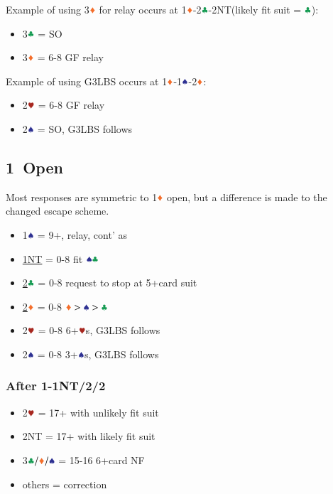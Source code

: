 \documentclass{article}
\begin{document}
\begin{multicols}{2}
\begin{CJK*}{UTF8}{gt}
\noindent Example of using 3$\ddd$ for relay occurs at 1$\ddd$-2$\ccc$-2NT(likely fit suit = $\ccc$):
\begin{itemize}
    \item 3$\ccc$ = SO
    \item 3$\ddd$ = 6-8 GF relay
\end{itemize}

\noindent Example of using G3LBS occurs at 1$\ddd$-1$\sss$-2$\ddd$:
\begin{itemize}
    \item 2$\hhh$ = 6-8 GF relay
    \item 2$\sss$ = SO, G3LBS follows
\end{itemize}

\subsection{1\HHH\ Open}\label{sec:1h}
Most responses are symmetric to 1$\ddd$ open, but a difference is made to the changed escape scheme.
\begin{itemize}
    \item 1$\sss$ = 9+, relay, cont' as 
    \item \hyperref[sec:1h-escape]{1NT} = 0-8 fit $\sss\ccc$
    \item \hyperref[sec:1h-escape]{2$\ccc$} = 0-8 request to stop at 5+card suit
    \item \hyperref[sec:1h-escape]{2$\ddd$} = 0-8 $\ddd>\sss>\ccc$
    \item 2$\hhh$ = 0-8 6+$\hhh$s, G3LBS follows
    \item 2$\sss$ = 0-8 3+$\sss$s, G3LBS follows
\end{itemize}

\subsubsection{After 1\HHH-1NT/2\CCC/2\DDD}\label{sec:1h-escape}
\begin{itemize}
    \item 2$\hhh$ = 17+ with unlikely fit suit
    \item 2NT = 17+ with likely fit suit
    \item 3$\ccc/\ddd/\sss$ = 15-16 6+card NF
    \item others = correction
\end{itemize}


\end{CJK*}
\end{multicols}
\end{document}
